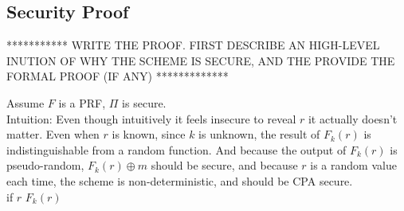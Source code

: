 \documentclass[11pt]{article}
\begin{document}
\subsection*{Security Proof}

*********** WRITE THE PROOF. FIRST DESCRIBE AN HIGH-LEVEL INUTION OF WHY THE SCHEME IS SECURE, AND THE PROVIDE THE FORMAL PROOF (IF ANY) *************

Assume $F$ is a PRF, $\Pi$ is secure. \\

Intuition: Even though intuitively it feels insecure to reveal $r$ it actually doesn't matter. Even when $r$ is known, since $k$ is unknown, the result of $F_k(r)$ is indistinguishable from a random function. And because the output of $F_k(r)$ is pseudo-random, $F_k(r) \oplus m $ should be secure, and because $r$ is a random value each time, the scheme is non-deterministic, and should be CPA secure. \\




if $r$ $F_k(r)$
\end{document}
